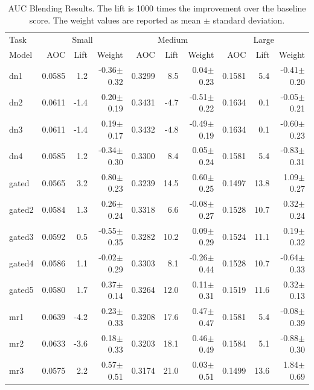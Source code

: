 \documentclass{article}
\begin{document}
\begin{table}[t]
\caption{AUC Blending Results.  The lift is 1000 times the improvement over the baseline score.  The weight values are reported as mean $\pm$ standard deviation.}
\label{table:auc-results}
\vskip 0.15in
\begin{center}
\begin{small}
\begin{sc}
\begin{tabular}{l|rr r|rr r|rr r}
\hline
\abovespace\belowspace
Task & \multicolumn{3}{|c}{Small} & \multicolumn{3}{|c}{Medium} & \multicolumn{3}{|c}{Large} \\
Model
& AOC & Lift & Weight 
& AOC & Lift & Weight 
& AOC & Lift & Weight \\
\hline
\abovespace
dn1        & 0.0585 &   1.2 & -0.36$\pm$0.32& 0.3299 &   8.5 &  0.04$\pm$0.23& 0.1581 &   5.4 & -0.41$\pm$0.20 \\ 
dn2        & 0.0611 &  -1.4 &  0.20$\pm$0.19& 0.3431 &  -4.7 & -0.51$\pm$0.22& 0.1634 &   0.1 & -0.05$\pm$0.21 \\ 
dn3        & 0.0611 &  -1.4 &  0.19$\pm$0.17& 0.3432 &  -4.8 & -0.49$\pm$0.19& 0.1634 &   0.1 & -0.60$\pm$0.23 \\ 
dn4        & 0.0585 &   1.2 & -0.34$\pm$0.30& 0.3300 &   8.4 &  0.05$\pm$0.24& 0.1581 &   5.4 & -0.83$\pm$0.31 \\ 
\abovespace
gated      & 0.0565 &   3.2 &  0.80$\pm$0.23& 0.3239 &  14.5 &  0.60$\pm$0.25& 0.1497 &  13.8 &  1.09$\pm$0.27 \\ 
gated2     & 0.0584 &   1.3 &  0.26$\pm$0.24& 0.3318 &   6.6 & -0.08$\pm$0.27& 0.1528 &  10.7 &  0.32$\pm$0.24 \\ 
gated3     & 0.0592 &   0.5 & -0.55$\pm$0.35& 0.3282 &  10.2 &  0.09$\pm$0.29& 0.1524 &  11.1 &  0.19$\pm$0.32 \\ 
gated4     & 0.0586 &   1.1 & -0.02$\pm$0.29& 0.3303 &   8.1 & -0.26$\pm$0.44& 0.1528 &  10.7 & -0.64$\pm$0.33 \\ 
gated5     & 0.0580 &   1.7 &  0.37$\pm$0.14& 0.3264 &  12.0 &  0.11$\pm$0.31& 0.1519 &  11.6 &  0.32$\pm$0.13 \\ 
\abovespace
mr1        & 0.0639 &  -4.2 &  0.23$\pm$0.33& 0.3208 &  17.6 &  0.47$\pm$0.47& 0.1581 &   5.4 & -0.08$\pm$0.39 \\ 
mr2        & 0.0633 &  -3.6 &  0.18$\pm$0.33& 0.3203 &  18.1 &  0.46$\pm$0.49& 0.1584 &   5.1 & -0.88$\pm$0.30 \\ 
mr3        & 0.0575 &   2.2 &  0.57$\pm$0.51& 0.3174 &  21.0 &  0.03$\pm$0.51& 0.1499 &  13.6 &  1.84$\pm$0.69 \\ 

\end{tabular}
\end{sc}
\end{small}
\end{center}
\end{table}
\end{document}
